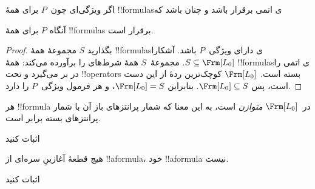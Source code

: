 \documentclass[../../../include/open-logic-section]{subfiles}
\begin{document}


\begin{thm}
  اگر ویژگی‌ای چون~$P$ برای همهٔ !!{formula}sی اتمی برقرار باشد و
  چنان باشد که
  \begin{enumerate}
  \end{enumerate}
  آنگاه $P$ برای همهٔ !!{formula}s برقرار است.
\end{thm}

\begin{proof}
  بگذارید $S$ مجموعهٔ همهٔ !!{formula}sی دارای ویژگی~$P$ باشد. آشکارا
  $S \subseteq \Frm[L_0]$. مجموعهٔ~$S$ همهٔ شرط‌های
   را برآورده می‌کند: همهٔ !!{formula}sی اتمی را
  در بر می‌گیرد و تحت !!{operator}s بسته است.  $\Frm[L_0]$ کوچک‌ترین ردهٔ
  از این دست است، پس $\Frm[L_0] \subseteq S$. بنابراین $\Frm[L_0] = S$، و
  هر فرمول ویژگی~$P$ را دارد.
\end{proof}

\begin{prop}
   هر !!{formula} در~$\Frm[L_0]$ \emph{متوازن} است، به این معنا که شمار
   پرانتزهای باز آن با شمار پرانتزهای بسته برابر است.
\end{prop}

\begin{prob}
اثبات کنید 
\end{prob}

\begin{prop} 
هیچ قطعهٔ آغازینِ سره‌ای از !!a{formula}، خود !!a{formula} نیست.
\end{prop}

\begin{prob}
  اثبات کنید 
\end{prob}
\end{document}
